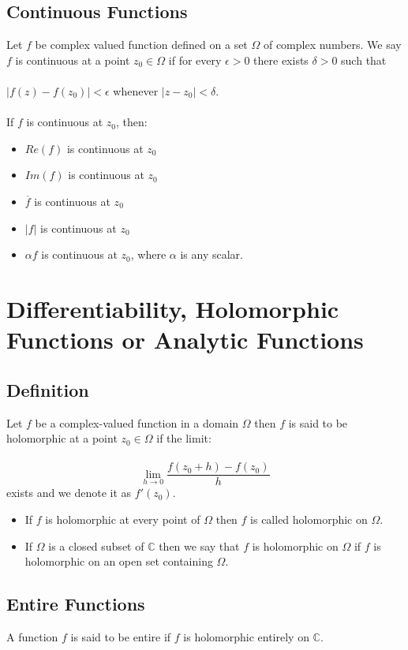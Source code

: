 \documentclass{article}
\begin{document}
\subsection{Continuous Functions}
Let $f$ be complex valued function defined on a set $\Omega$ of complex numbers. We say $f$ is continuous at a point $z_0\in \Omega$ if for every $\epsilon>0$ there exists $\delta>0$ such that
\\
\\
$|f(z)-f(z_0)|<\epsilon$ whenever $|z-z_0|<\delta$.
\\
\\
If $f$ is continuous at $z_0$, then:
\begin{itemize}
    \item $Re(f)$ is continuous at $z_0$
    \item $Im(f)$ is continuous at $z_0$
    \item $\overline{f}$ is continuous at $z_0$
    \item $|f|$ is continuous at $z_0$
    \item $\alpha f$ is continuous at $z_0$, where $\alpha$ is any scalar.
\end{itemize}
\section{Differentiability, Holomorphic Functions or Analytic Functions}
\subsection{Definition}
Let $f$ be a complex-valued function in a domain $\Omega$ then $f$ is said to be holomorphic at a point $z_0\in \Omega$ if the limit:
\\
\\
\[
\boxed{\lim_{h \to 0}\frac{f(z_0+h)-f(z_0)}{h}}
\]
exists and we denote it as $f'(z_0)$.
\begin{itemize}
    \item If $f$ is holomorphic at every point of $\Omega$ then $f$ is called holomorphic on $\Omega$.
    \item If $\Omega$ is a closed subset of $\mathbb{C}$ then we say that $f$ is holomorphic on $\Omega$ if $f$ is holomorphic on an open set containing $\Omega$.
\end{itemize}
\subsection{Entire Functions}
A function $f$ is said to be entire if $f$ is holomorphic entirely on $\mathbb{C}$.
\end{document}
